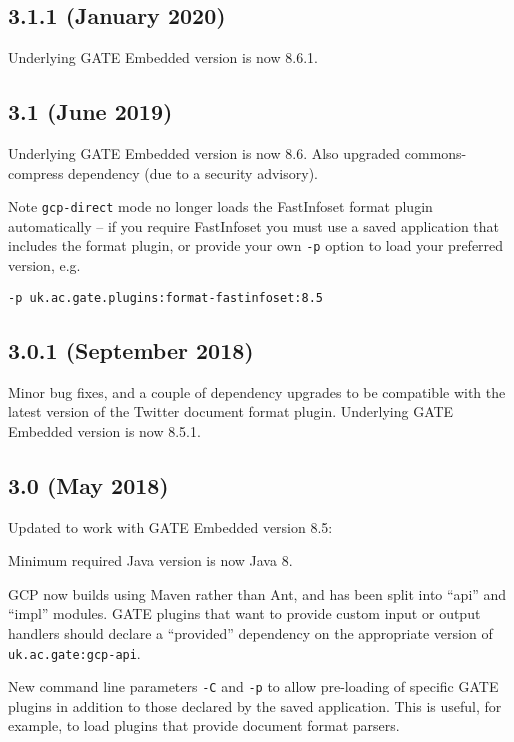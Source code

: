 \subsection{3.1.1 (January 2020)}

Underlying GATE Embedded version is now 8.6.1.

\subsection{3.1 (June 2019)}

Underlying GATE Embedded version is now 8.6.  Also upgraded commons-compress
dependency (due to a security advisory).

Note \verb!gcp-direct! mode no longer loads the FastInfoset format plugin
automatically -- if you require FastInfoset you must use a saved application
that includes the format plugin, or provide your own \verb!-p! option to load
your preferred version, e.g.
\begin{verbatim}
-p uk.ac.gate.plugins:format-fastinfoset:8.5
\end{verbatim}

\subsection{3.0.1 (September 2018)}

Minor bug fixes, and a couple of dependency upgrades to be compatible with the
latest version of the Twitter document format plugin.  Underlying GATE Embedded
version is now 8.5.1.

\subsection{3.0 (May 2018)}

Updated to work with GATE Embedded version 8.5:
\bit
\item Minimum required Java version is now Java 8.
\item GCP now builds using Maven rather than Ant, and has been split into
  ``api'' and ``impl'' modules. GATE plugins that want to provide custom input
  or output handlers should declare a ``provided'' dependency on the
  appropriate version of \verb!uk.ac.gate:gcp-api!.
\item New command line parameters \verb!-C! and \verb!-p! to allow pre-loading
  of specific GATE plugins in addition to those declared by the saved
  application.  This is useful, for example, to load plugins that provide
  document format parsers.
\eit

